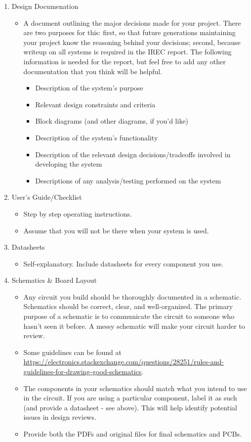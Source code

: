 \documentclass{article}
\begin{document}
\begin{enumerate}
\item Design Documenation
    \begin{itemize}
    \item A document outlining the major decisions made for your project. There are two purposes for this: first, so that future generations maintaining your project know the reasoning behind your decisions; second, because writeup on all systems is required in the IREC report. The following information is needed for the report, but feel free to add any other documentation that you think will be helpful.
        \begin{itemize}
        \item Description of the system's purpose
        \item Relevant design constraints and criteria
        \item Block diagrams (and other diagrams, if you'd like)
        \item Description of the system's functionality
        \item Description of the relevant design decisions/tradeoffs involved in developing the system
        \item Descriptions of any analysis/testing performed on the system
        \end{itemize}
    \end{itemize}
\item User's Guide/Checklist
    \begin{itemize}
    \item Step by step operating instructions.
    \item Assume that you will not be there when your system is used.
    \end{itemize}
\item Datasheets
    \begin{itemize}
    \item Self-explanatory. Include datasheets for every component you use.
    \end{itemize}
\item Schematics \& Board Layout
    \begin{itemize}
    \item Any circuit you build should be thoroughly documented in a schematic. Schematics should be correct, clear, and well-organized. The primary purpose of a schematic is to communicate the circuit to someone who hasn't seen it before. A messy schematic will make your circuit harder to review.
    \item Some guidelines can be found at \url{https://electronics.stackexchange.com/questions/28251/rules-and-guidelines-for-drawing-good-schematics}.
    \item The components in your schematics should match what you intend to use in the circuit. If you are using a particular component, label it as such (and provide a datasheet - see above). This will help identify potential issues in design reviews.
    \item Provide both the PDFs and original files for final schematics and PCBs.
    \end{itemize}
\end{enumerate}
\end{document}
